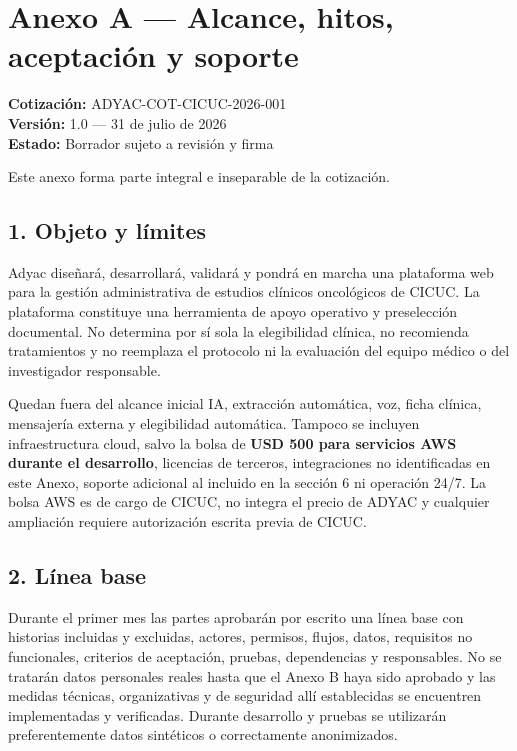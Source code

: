 \documentclass[
]{article}
\author{}
\date{}
\begin{document}
\hypertarget{anexo-a--alcance-hitos-aceptaciuxf3n-y-soporte}{%
\section{Anexo A --- Alcance, hitos, aceptación y
soporte}\label{anexo-a--alcance-hitos-aceptaciuxf3n-y-soporte}}

\textbf{Cotización:} ADYAC-COT-CICUC-2026-001\\
\textbf{Versión:} 1.0 --- 31 de julio de 2026\\
\textbf{Estado:} Borrador sujeto a revisión y firma

Este anexo forma parte integral e inseparable de la cotización.

\hypertarget{1-objeto-y-luxedmites}{%
\subsection{1. Objeto y límites}\label{1-objeto-y-luxedmites}}

Adyac diseñará, desarrollará, validará y pondrá en marcha una plataforma
web para la gestión administrativa de estudios clínicos oncológicos de
CICUC. La plataforma constituye una herramienta de apoyo operativo y
preselección documental. No determina por sí sola la elegibilidad
clínica, no recomienda tratamientos y no reemplaza el protocolo ni la
evaluación del equipo médico o del investigador responsable.

Quedan fuera del alcance inicial IA, extracción automática, voz, ficha
clínica, mensajería externa y elegibilidad automática. Tampoco se
incluyen infraestructura cloud, salvo la bolsa de \textbf{USD 500 para
servicios AWS durante el desarrollo}, licencias de terceros,
integraciones no identificadas en este Anexo, soporte adicional al
incluido en la sección 6 ni operación 24/7. La bolsa AWS es de cargo de
CICUC, no integra el precio de ADYAC y cualquier ampliación requiere
autorización escrita previa de CICUC.

\hypertarget{2-luxednea-base}{%
\subsection{2. Línea base}\label{2-luxednea-base}}

Durante el primer mes las partes aprobarán por escrito una línea base
con historias incluidas y excluidas, actores, permisos, flujos, datos,
requisitos no funcionales, criterios de aceptación, pruebas,
dependencias y responsables. No se tratarán datos personales reales
hasta que el Anexo B haya sido aprobado y las medidas técnicas,
organizativas y de seguridad allí establecidas se encuentren
implementadas y verificadas. Durante desarrollo y pruebas se utilizarán
preferentemente datos sintéticos o correctamente anonimizados.
\end{document}
